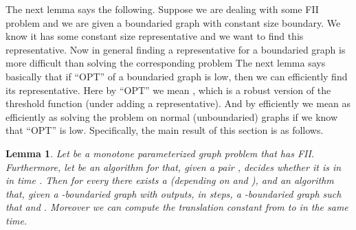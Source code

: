 \documentclass[11pt]{article}
\newtheorem{lemma}{Lemma}
\begin{document}
The next lemma says the following. Suppose we are dealing with some FII problem and we are given a boundaried graph with constant size boundary.  We know it has some constant size representative and we want to find this representative. 
Now in general finding a representative for a boundaried graph is more difficult than solving the corresponding problem
The next lemma says basically that if ``OPT'' of a boundaried graph is low, then we can efficiently find its representative. 
Here by ``OPT''  we mean , which is a robust version of the threshold function (under adding a representative). 
And by efficiently we mean as efficiently as solving the problem on normal (unboundaried) graphs if we know that ``OPT'' is low. Specifically, the main result of this section is as follows. 

\begin{lemma}
\label{lem:red2finiteindex}
Let  be a monotone parameterized graph problem that has FII. Furthermore, let  be an 
algorithm for  that, given a pair , decides whether it is in  in time . 
Then for every  there exists a  (depending on  and ), and 
an algorithm that, given a -boundaried graph   with  outputs, in   steps,
a -boundaried graph   such that  and  . Moreover we can compute the translation 
constant   from  to  in the same time.
\end{lemma}
\end{document}
